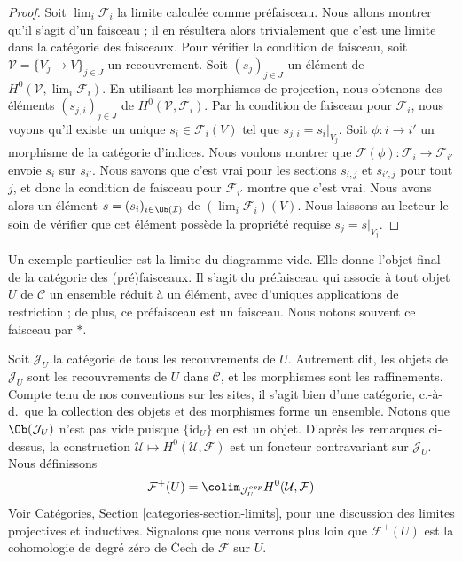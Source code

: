 \begin{proof}
Soit $\lim_i \mathcal{F}_i$ la limite calculée comme préfaisceau.
Nous allons montrer qu’il s’agit d’un faisceau ; il en résultera alors trivialement
que c’est une limite dans la catégorie des faisceaux. Pour vérifier la condition
de faisceau, soit $\mathcal{V} = \{V_j \to V\}_{j\in J}$ un recouvrement.
Soit $(s_j)_{j\in J}$ un élément de $H^0(\mathcal{V}, \lim_i \mathcal{F}_i)$.
En utilisant les morphismes de projection, nous obtenons des éléments $(s_{j, i})_{j\in J}$
de $H^0(\mathcal{V}, \mathcal{F}_i)$. Par la condition de faisceau pour
$\mathcal{F}_i$, nous voyons qu’il existe un unique $s_i \in \mathcal{F}_i(V)$
tel que $s_{j, i} = s_i|_{V_j}$. Soit $\phi : i \to i'$ un morphisme
de la catégorie d’indices. Nous voulons montrer que
$\mathcal{F}(\phi) : \mathcal{F}_i \to \mathcal{F}_{i'}$
envoie $s_i$ sur $s_{i'}$. Nous savons que c’est vrai pour les sections
$s_{i, j}$ et $s_{i', j}$ pour tout $j$, et donc la condition de faisceau
pour $\mathcal{F}_{i'}$ montre que c’est vrai. Nous avons alors un
élément $s = (s_i)_{i \in \Ob(\mathcal{I})}$ de
$(\lim_i \mathcal{F}_i)(V)$. Nous laissons au lecteur le soin de vérifier
que cet élément possède la propriété requise $s_j = s|_{V_j}$.
\end{proof}

\begin{example}
\label{example-singleton-sheaf}
Un exemple particulier est la limite du diagramme vide.
Elle donne l’objet final de la catégorie des (pré)faisceaux.
Il s’agit du préfaisceau qui associe
à tout objet $U$ de $\mathcal{C}$ un ensemble réduit à un élément, avec d’uniques
applications de restriction ; de plus, ce préfaisceau est un faisceau.
Nous notons souvent ce faisceau par $*$.
\end{example}

\noindent
Soit $\mathcal{J}_U$ la catégorie de tous les recouvrements de $U$.
Autrement dit, les objets de $\mathcal{J}_U$ sont les recouvrements
de $U$ dans $\mathcal{C}$, et les morphismes sont les raffinements.
Compte tenu de nos conventions sur les sites, il s’agit bien d’une catégorie, c.-à-d.\ que
la collection des objets et des morphismes forme un ensemble.
Notons que $\Ob(\mathcal{J}_U)$ n’est pas vide puisque
$\{\text{id}_U\}$ en est un objet. D’après les remarques
ci-dessus, la construction $\mathcal{U} \mapsto H^0(\mathcal{U}, \mathcal{F})$
est un foncteur contravariant sur $\mathcal{J}_U$.
Nous définissons
$$
\mathcal{F}^{+}(U)
=
\colim_{\mathcal{J}_U^{opp}}
H^0(\mathcal{U}, \mathcal{F})
$$
Voir Catégories, Section \ref{categories-section-limits}, pour
une discussion des limites projectives et inductives. Signalons que nous
verrons plus loin que $\mathcal{F}^{+}(U)$ est la cohomologie de degré zéro de
{\v C}ech de $\mathcal{F}$ sur $U$.

